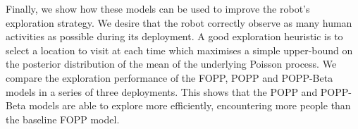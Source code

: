 Finally, we show how these models can be used to improve the robot's exploration strategy. We desire that the robot correctly observe as many human activities as possible during its deployment. A good exploration heuristic is to select a location to visit at each time which maximises a simple upper-bound on the posterior distribution of the mean of the underlying Poisson process. We compare the exploration performance of the FOPP, POPP and POPP-Beta models in a series of three deployments. This shows that the POPP and POPP-Beta models are able to explore more efficiently, encountering more people than the baseline FOPP model.

% 


